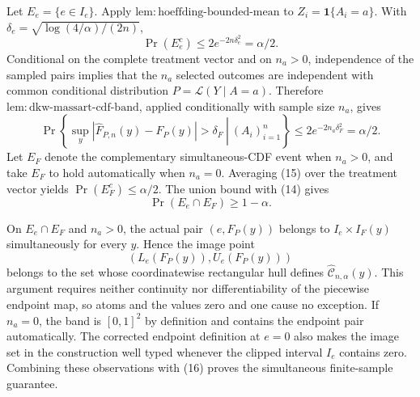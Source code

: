 Let \(E_e=\{e\in I_e\}\).  Apply \(\mathrm{lem:hoeffding\text{-}bounded\text{-}mean}\) to \(Z_i=\mathbf 1\{A_i=a\}\).  With \(\delta_e=\sqrt{\log(4/\alpha)/(2n)}\),
\[
 \Pr(E_e^c)\le2e^{-2n\delta_e^2}=\alpha/2. \tag{14}
\]
Conditional on the complete treatment vector and on \(n_a>0\), independence of the sampled pairs implies that the \(n_a\) selected outcomes are independent with common conditional distribution \(P=\mathcal L(Y\mid A=a)\).  Therefore \(\mathrm{lem:dkw\text{-}massart\text{-}cdf\text{-}band}\), applied conditionally with sample size \(n_a\), gives
\[
 \Pr\left\{\left.\sup_y|\widehat F_{P,n}(y)-F_P(y)|>\delta_F\ \right|\ (A_i)_{i=1}^n\right\}
 \le2e^{-2n_a\delta_F^2}=\alpha/2. \tag{15}
\]
Let \(E_F\) denote the complementary simultaneous-CDF event when \(n_a>0\), and take \(E_F\) to hold automatically when \(n_a=0\).  Averaging (15) over the treatment vector yields \(\Pr(E_F^c)\le\alpha/2\).  The union bound with (14) gives
\[
 \Pr(E_e\cap E_F)\ge1-\alpha. \tag{16}
\]

On \(E_e\cap E_F\) and \(n_a>0\), the actual pair \((e,F_P(y))\) belongs to \(I_e\times I_F(y)\) simultaneously for every \(y\).  Hence the image point
\[
 (L_e(F_P(y)),U_e(F_P(y)))
\]
belongs to the set whose coordinatewise rectangular hull defines \(\widehat{\mathcal C}_{n,\alpha}(y)\).  This argument requires neither continuity nor differentiability of the piecewise endpoint map, so atoms and the values zero and one cause no exception.  If \(n_a=0\), the band is \([0,1]^2\) by definition and contains the endpoint pair automatically.  The corrected endpoint definition at \(e=0\) also makes the image set in the construction well typed whenever the clipped interval \(I_e\) contains zero.  Combining these observations with (16) proves the simultaneous finite-sample guarantee.